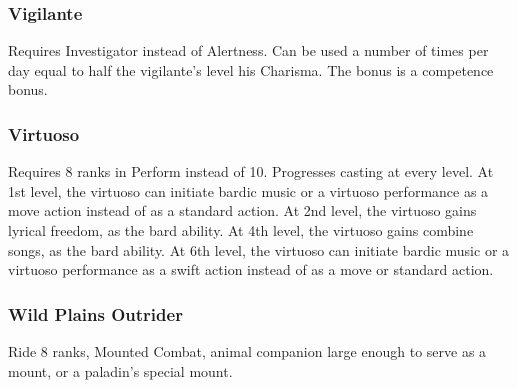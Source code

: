 \subsubsection{Vigilante}
 Requires Investigator instead of Alertness.
 Can be used a number of times per day equal to half the vigilante's level \add his Charisma.
 The bonus is a competence bonus.
\subsubsection{Virtuoso}
 Requires 8 ranks in Perform instead of 10.
 Progresses casting at every level.
 At 1st level, the virtuoso can initiate bardic music or a virtuoso performance as a move action instead of as a standard action.
 At 2nd level, the virtuoso gains lyrical freedom, as the bard ability.
 At 4th level, the virtuoso gains combine songs, as the bard ability.
 At 6th level, the virtuoso can initiate bardic music or a virtuoso performance as a swift action instead of as a move or standard action.
\subsubsection{Wild Plains Outrider}
 Ride 8 ranks, Mounted Combat, animal companion large enough to serve as a mount, or a paladin's special mount.

